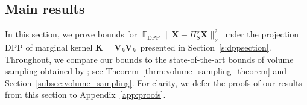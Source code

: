 \documentclass[twoside,11pt]{book}
\newtheorem{proposition}{Proposition}
\numberwithin{theorem}{chapter}
\numberwithin{definition}{chapter}
\numberwithin{proposition}{chapter}
\numberwithin{corollary}{chapter}
\numberwithin{example}{chapter}
\numberwithin{lemma}{chapter}
\DeclareMathOperator{\Det}{Det}
\DeclareMathOperator{\Fr}{\mathrm{Fr}}
\DeclareMathOperator{\DPP}{\mathrm{DPP}}
\DeclareMathOperator{\VS}{\mathrm{VS}}
\DeclareMathOperator{\Tran}{\intercal}
\DeclareMathOperator{\EX}{\mathbb{E}}
\DeclareMathOperator{\Prb}{\mathbb{P}}
\begin{document}
\subsection{Main results}
In this section, we prove bounds for $\EX_{\DPP} \| \bm{X} - \Pi_{S}^{\nu}\bm{X} \|^2_{\nu}$ under the projection DPP of marginal kernel $\bm{K} = \bm{V}^{}_{k}\bm{V}^{\Tran}_{k}$ presented in Section~\ref{s:dppsection}. Throughout, we compare our bounds to the state-of-the-art bounds of volume sampling obtained by \cite{DRVW06}; see Theorem~\ref{thrm:volume_sampling_theorem} and Section~\ref{subsec:volume_sampling}. For clarity, we defer the proofs of our results from this section to Appendix~\ref{app:proofs}.

%

\end{document}
